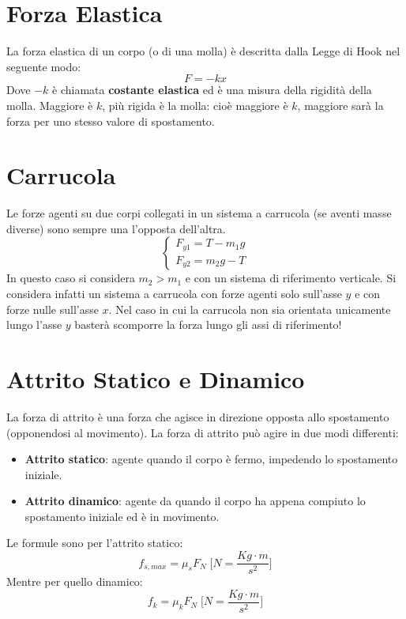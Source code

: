     \section{Forza Elastica} La forza elastica di un corpo (o di una molla) è 
    descritta dalla Legge di Hook nel seguente modo:
        \begin{equation}
            F = -kx
        \end{equation}
    Dove $-k$ è chiamata \textbf{costante elastica} ed è una misura della 
    rigidità della molla. Maggiore è $k$, più rigida è la molla: cioè maggiore 
    è $k$, maggiore sarà la forza per uno stesso valore di spostamento.

    \section{Carrucola} Le forze agenti su due corpi collegati in un sistema a
    carrucola (se aventi masse diverse) sono sempre una l'opposta dell'altra.
        \begin{equation}
            \begin{cases}
                F_{y1} = T - m_1g \\
                F_{y2} = m_2g - T
            \end{cases}
        \end{equation}
    In questo caso si considera $m_2 > m_1$ e con un sistema di riferimento 
    verticale. Si considera infatti un sistema a carrucola con forze agenti 
    solo sull'asse $y$ e con forze nulle sull'asse $x$. Nel caso in cui la 
    carrucola non sia orientata unicamente lungo l'asse $y$ basterà scomporre
    la forza lungo gli assi di riferimento!

    \section{Attrito Statico e Dinamico} La forza di attrito è una forza che 
    agisce in direzione opposta allo spostamento (opponendosi al movimento). La 
    forza di attrito può agire in due modi differenti:
        \begin{itemize}
            \item \textbf{Attrito statico}: agente quando il corpo è fermo, 
            impedendo lo spostamento iniziale.
            \item \textbf{Attrito dinamico}: agente da quando il corpo ha 
            appena compiuto lo spostamento iniziale ed è in movimento.
        \end{itemize}
    Le formule sono per l'attrito statico:
        \begin{equation}
            f_{s, max} = \mu_sF_N \;\Bigg[N = \frac{Kg \cdot m} {s^2} \Bigg]
        \end{equation}
        Mentre per quello dinamico:
        \begin{equation}
            f_{k} = \mu_kF_N \;\Bigg[N = \frac{Kg \cdot m} {s^2} \Bigg]
        \end{equation}
    
